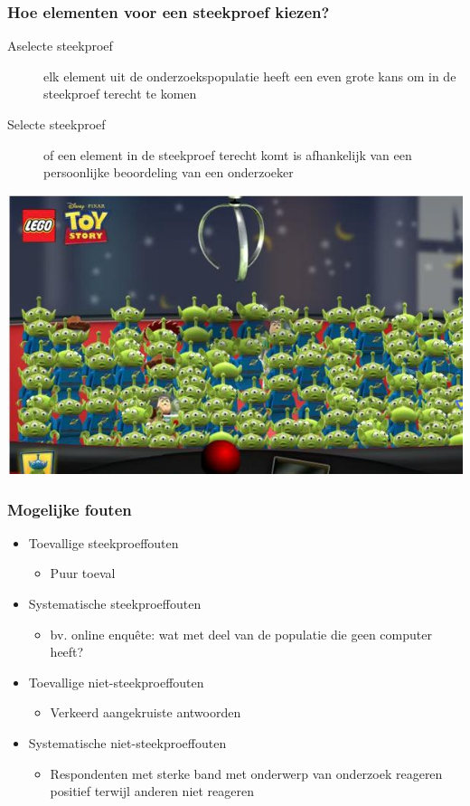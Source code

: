 \documentclass{beamer}
\begin{document}
\begin{frame}
  \frametitle{Hoe elementen voor een steekproef kiezen?}

  \begin{description}
    \item[Aselecte steekproef] elk element uit de onderzoekspopulatie heeft een even grote kans om in de steekproef terecht te komen
    \item[Selecte steekproef] of een element in de steekproef terecht komt is afhankelijk van een persoonlijke beoordeling van een onderzoeker
  \end{description}

  \begin{center}
    \includegraphics[width=.5\textwidth]{img/les4-aselect}
  \end{center}
\end{frame}

\begin{frame}
  \frametitle{Mogelijke fouten}

  \begin{itemize}
    \item<+-> Toevallige steekproeffouten
      \begin{itemize}
        \item Puur toeval
      \end{itemize}
    \item<+-> Systematische steekproeffouten
      \begin{itemize}
        \item bv. online enquête: wat met deel van de populatie die geen computer heeft?
      \end{itemize}
    \item<+-> Toevallige niet-steekproeffouten
      \begin{itemize}
        \item Verkeerd aangekruiste antwoorden
      \end{itemize}
    \item<+-> Systematische niet-steekproeffouten
      \begin{itemize}
        \item Respondenten met sterke band met onderwerp van onderzoek reageren positief terwijl anderen niet reageren
      \end{itemize}
  \end{itemize}
\end{frame}
\end{document}
